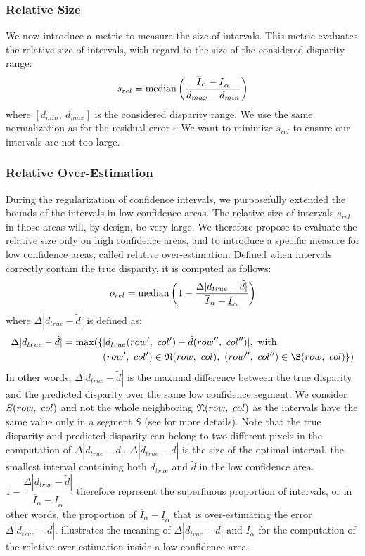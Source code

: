 \subsubsection{Relative Size}
We now introduce a metric to measure the size of intervals. This metric evaluates the relative size of intervals, with regard to the size of the considered disparity range:
\begin{align}\label{eq:relative_size_disparity}
    s_{rel}=\operatorname*{median}\left(\dfrac{\overline{I}_\alpha-\underline{I}_\alpha}{d_{max}-d_{min}}\right)
\end{align}
where $[d_{min}, ~d_{max}]$ is the considered disparity range. We use the same normalization as for the residual error $\varepsilon$ We want to minimize $s_{rel}$ to ensure our intervals are not too large.

\subsubsection{Relative Over-Estimation}
During the regularization of confidence intervals, we purposefully extended the bounds of the intervals in low confidence areas. The relative size of intervals $s_{rel}$ in those areas will, by design, be very large. We therefore propose to evaluate the relative size only on high confidence areas, and to introduce a specific measure for low confidence areas, called relative over-estimation. Defined when intervals correctly contain the true disparity, it is computed as follows:
\begin{align}
    o_{rel}=\operatorname*{median}\left(1-\dfrac{\Delta|d_{true}-\tilde{d}|}{\overline{I}_\alpha-\underline{I}_\alpha}\right)\label{eq:relative_overestimation_disparity}
\end{align}
where $\Delta|d_{true}-\tilde{d}|$ is defined as:
\begin{align}
    \Delta|d_{true}-\tilde{d}|=\max(\{&|d_{true}(row', ~col')-\tilde{d}(row'', ~col'')|, \text{ with}~\nonumber\\&(row',~col')\in \N(\rowcol), ~ (row'',~col'')\in \S(\rowcol)\})
\end{align}
In other words, $\Delta|d_{true}-\tilde{d}|$ is the maximal difference between the true disparity and the predicted disparity over the same low confidence segment. We consider $S(row, ~col)$ and not the whole neighboring $\mathfrak{N}(row, ~col)$ as the intervals have the same value only in a segment $S$ (see  for more details). Note that the true disparity and predicted disparity can belong to two different pixels in the computation of $\Delta|d_{true}-\tilde{d}|$. $\Delta|d_{true}-\tilde{d}|$ is the size of the optimal interval, \ie the smallest interval containing both $d_{true}$ and $\tilde{d}$ in the low confidence area. $1-\dfrac{\Delta|d_{true}-\tilde{d}|}{\overline{I}_\alpha-\underline{I}_\alpha}$ therefore represent the superfluous proportion of intervals, or in other words, the proportion of $\overline{I}_\alpha-\underline{I}_\alpha$ that is over-estimating the error $\Delta|d_{true}-\tilde{d}|$.  illustrates the meaning of $\Delta|d_{true}-\tilde{d}|$ and $I_\alpha$ for the computation of the relative over-estimation inside a low confidence area.

